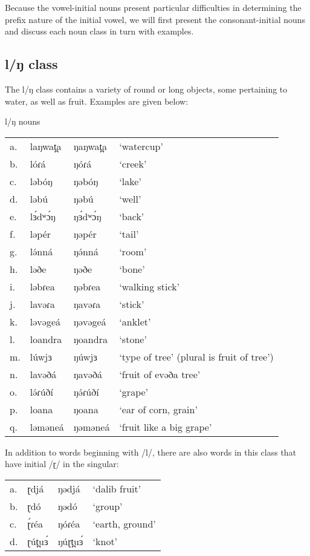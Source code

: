 Because the vowel-initial nouns present particular difficulties in determining the prefix nature of the initial vowel, we will first present the consonant-initial nouns and discuss each noun class in turn with examples.

\subsection{l/ŋ class}

The l/ŋ class contains a variety of round or long objects, some pertaining to water, as well as fruit. Examples are given below:

\ea 	l/ŋ nouns
\begin{tabular}[t]{llll}
a.&	laŋwat̪a	&ŋaŋwat̪a	&‘watercup’\\
b.&	lóɾá	&ŋóɾá		&‘creek’\\
c.&	ləbóŋ	&ŋəbóŋ		&‘lake’\\
d.&	ləbú	&ŋəbú		&‘well’\\
e.&	lɜ́dʷɔ́ŋ	&ŋɜ́dʷɔ́ŋ		&‘back’\\
f.&	ləpér	&ŋəpér		&‘tail’\\
g.&	lə́nná	&ŋə́nná		&‘room’\\
h.&	ləðe	&ŋəðe		&‘bone’\\
i.&	ləbɾea	&ŋəbɾea		&‘walking stick’\\
j.&	lavəɾa	&ŋavəɾa		&‘stick’\\
k.&	ləvəgeá	&ŋəvəgeá	&‘anklet’\\
l.&	loandra	&ŋoandra	&‘stone’\\
m.&	lúwjɜ	&ŋúwjɜ		&‘type of tree’ (plural is fruit of tree’)\\
n.&	lavəðá	&ŋavəðá		&‘fruit of evəða tree’\\
o.&	lə́ɾúðí	&ŋə́ɾúðí		&‘grape’\\
p.&	loana	&ŋoana		&‘ear of corn, grain’\\
q.&	ləməneá	&ŋəməneá	&‘fruit like a big grape’\\
\end{tabular} \z

In addition to words beginning with /l/, there are also words in this class that have initial /ɽ/ in the singular:

\ea
\begin{tabular}[t]{llll}
a.&	ɽdjá	&	ŋədjá	&	‘dalib fruit’ \\
b.&	ɽdó		&	ŋədó	&	‘group’\\
c.&	ɽ́ɾéa	&	ŋóɾéa	&	‘earth, ground’\\
d.&	ɽút̪uɜ́	&	ŋúɽt̪uɜ́	&	‘knot’\\
\end{tabular}
\z

